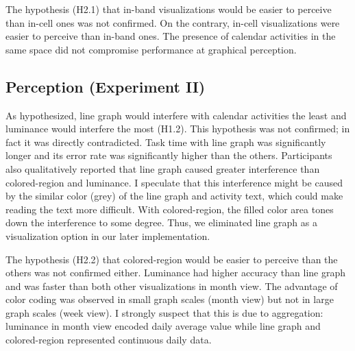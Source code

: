 \documentclass[12pt,oneside]{book}
\begin{document}
The hypothesis (H2.1) that in-band visualizations would be easier to perceive than in-cell ones was not confirmed. On the contrary, in-cell visualizations were easier to perceive than in-band ones. The presence of calendar activities in the same space did not compromise performance at graphical perception.

\subsection{Perception (Experiment II)}

As hypothesized, line graph would interfere with calendar activities the least and luminance would interfere the most (H1.2). This hypothesis was not confirmed; in fact it was directly contradicted. Task time with line graph was significantly longer and its error rate was significantly higher than the others. Participants also qualitatively reported that line graph caused greater interference than colored-region and luminance. I speculate that this interference might be caused by the similar color (grey) of the line graph and activity text, which could make reading the text more difficult. With colored-region, the filled color area tones down the interference to some degree. Thus, we eliminated line graph as a visualization option in our later implementation.

The hypothesis (H2.2) that colored-region would be easier to perceive than the others was not confirmed either. Luminance had higher accuracy than line graph and was faster than both other visualizations in month view. The advantage of color coding was observed in small graph scales (month view) but not in large graph scales (week view). I strongly suspect that this is due to aggregation: luminance in month view encoded daily average value while line graph and colored-region represented continuous daily data.
\end{document}
